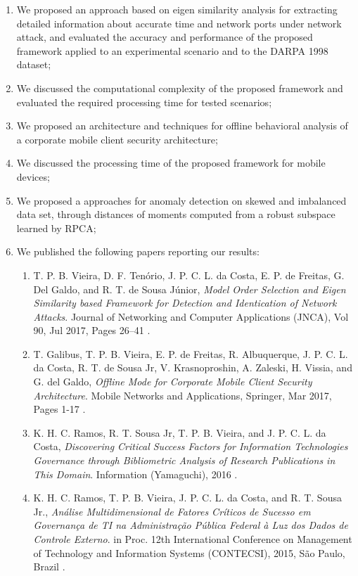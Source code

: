 \begin{enumerate}
	\item We proposed an approach based on eigen similarity analysis for extracting detailed information about accurate time and network ports under network attack, and evaluated the accuracy and performance of the proposed framework applied to an experimental scenario and to the DARPA 1998 dataset;
	\item We discussed the computational complexity of the proposed framework and evaluated the required processing time for tested scenarios;
	\item We proposed an architecture and techniques for offline behavioral analysis of a corporate mobile client security architecture;
	\item We discussed the processing time of the proposed framework for mobile devices;
	\item We proposed a approaches for anomaly detection on skewed and imbalanced data set, through distances of moments computed from a robust subspace learned by RPCA;
	\item We published the following papers reporting our results:
	\begin{enumerate}
		\item T. P. B. Vieira, D. F. Ten\'orio, J. P. C. L. da Costa, E. P. de Freitas, G. Del Galdo, and R. T. de Sousa J\'unior, \textit{Model Order Selection and Eigen Similarity based Framework for Detection and Identication of Network Attacks}. Journal of Networking and Computer Applications (JNCA), Vol 90, Jul 2017, Pages 26–41 \cite{vieira2017model}.
		\item T. Galibus, T. P. B. Vieira, E. P. de Freitas, R. Albuquerque, J. P. C. L. da Costa, R. T. de Sousa Jr, V. Krasnoproshin, A. Zaleski, H. Vissia, and G. del Galdo, \textit{Offline Mode for Corporate Mobile Client Security Architecture}. Mobile Networks and Applications, Springer, Mar 2017, Pages 1-17 \cite{galibus2017offline}.
		\item K. H. C. Ramos, R. T. Sousa Jr, T. P. B. Vieira, and J. P. C. L. da Costa, \textit{Discovering Critical Success Factors for Information Technologies Governance through Bibliometric Analysis of Research Publications in This Domain}. Information (Yamaguchi), 2016 \cite{ramos2016information}.
		\item K. H. C. Ramos, T. P. B. Vieira, J. P. C. L. da Costa, and R. T. Sousa Jr., \textit{Análise Multidimensional de Fatores Críticos de Sucesso em Governança de TI na Administração Pública Federal à Luz dos Dados de Controle Externo}. in Proc. 12th International Conference on Management of Technology and Information Systems (CONTECSI), 2015, São Paulo, Brazil \cite{ramos2015}.
	\end{enumerate}
\end{enumerate}


